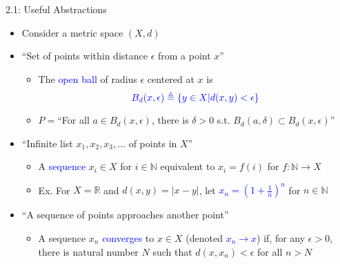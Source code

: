\documentclass[10pt,english]{beamer}
\begin{document}
\begin{frame}{2.1: Useful Abstractions}

\hfill
\scalebox{0.9}{%
\begin{tikzpicture}
\draw[very thick] (0,0) rectangle (3,2.75) node[below left=0.2cm and 0.2cm] {$X$};
\draw[thick,dashed,blue,fill=blue!10] (1.25,1.25) circle (1) node[above=0.3cm] {$B(x,\epsilon)$};
\node [label=right:{$x$},draw,fill=black,circle,inner sep=0pt,minimum size=2pt] at (1.25,1.25) {};
\draw[-latex] (1.25,1.25) -- node[below] {$\epsilon$} (0.25,1.25);
\end{tikzpicture}}
\vspace{-18mm}

\begin{itemize}
\setlength\itemsep{4mm}
\item<1-> Consider a metric space $(X,d)$

\item<1-> ``Set of points within distance $\epsilon$ from a point $x$'' \vspace{1mm}
\begin{itemize} 
  \setlength\itemsep{1.5mm}
  \item The \textcolor{blue}{open ball} of radius $\epsilon$ centered at $x$ is \vspace{-1mm} \[\color{blue} B_d(x,\epsilon) \triangleq \left\{ y \in X | d(x,y) < \epsilon \right\} \vspace{-5mm} \]
  \item $P=$``For all $a\!\in\! B_d (x,\epsilon)$, there is $\delta\!>\!0$ s.t. $B_d (a,\delta) \subset B_d (x,\epsilon)$''
\end{itemize}

\item<2-> ``Infinite list $x_1,x_2,x_3,\ldots$ of points in $X$'' \vspace{1mm}
\begin{itemize} 
  \setlength\itemsep{1.5mm}
  \item A \textcolor{blue}{sequence} $x_i \in X$ for $i\in \mathbb{N}$ equivalent to $x_i = f(i)$ for $f:\mathbb{N}\to X$
  \item Ex. For $X=\mathbb{R}$ and $d(x,y)=|x-y|$, let \textcolor{blue}{$x_n = \left(1+\frac{1}{n}\right)^n$} for $n\in \mathbb{N}$
\end{itemize}

\item<3-> ``A sequence of points approaches another point'' \vspace{1mm}
\begin{itemize} 
  \setlength\itemsep{1.5mm}
  \item A sequence $x_n$ \textcolor{blue}{converges} to $x\in X$ (denoted \textcolor{blue}{$x_n \to x$})  if, for any $\epsilon >0$, there is natural number $N$ such that $d(x,x_n) < \epsilon$ for all $n>N$
\end{itemize}
  
\end{itemize}
\end{frame}
\end{document}
